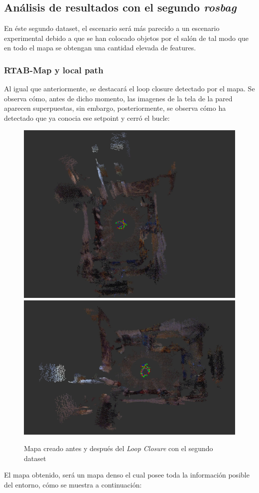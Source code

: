 \subsection{Análisis de resultados con el segundo \textit{rosbag}}
En éste segundo dataset, el escenario será más parecido a un escenario experimental debido a que se han colocado objetos por el salón de tal modo que en todo el mapa se
obtengan una cantidad elevada de features.
\subsubsection{RTAB-Map y local path}
Al igual que anteriormente, se destacará el loop closure detectado por el mapa. Se observa cómo, antes de dicho momento, las imagenes de la tela de la pared aparecen superpuestas,
sin embargo, posteriormente, se observa cómo ha detectado que ya conocia ese setpoint y cerró el bucle:
\begin{figure}[h!]
    \centering
    \includegraphics[width=.4\textwidth]{images/slam/bag3_rtabmap_noLC}
    \includegraphics[width=.415\textwidth]{images/slam/bag3_rtabmap_LC}
    \caption{Mapa creado antes y después del \textit{Loop Closure} con el segundo dataset}
\end{figure}
El mapa obtenido, será un mapa denso el cual posee toda la información posible del entorno, cómo se muestra a continuación:

